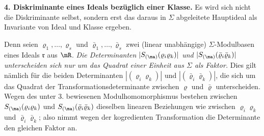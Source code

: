 \textbf{4. Diskriminante eines Ideals bezüglich einer Klasse.} Es wird sich nicht die Diskriminante selbst, sondern erst das daraus in $\Sigma$ abgeleitete Hauptideal als Invariante von Ideal und Klasse ergeben.

Denn seien $\varrho_1,\ldots,\varrho_s$ und $\bar\varrho_1,\ldots,\bar\varrho_s$ zwei (linear unabhängige) $\Sigma$-Modulbasen eines Ideals $\mathfrak r$ aus $\mR$. \emph{Die Determinanten $|S_{(\ma)}(\varrho_i\varrho_k)|$ und $|S_{(\ma)}(\bar\varrho_i\bar\varrho_k)|$ unterscheiden sich nur um das Quadrat einer Einheit aus $\Sigma$ als Faktor.} Dies gilt nämlich für die beiden Determinanten $|(\varrho_i\varrho_k)|$ und $|(\bar\varrho_i\bar\varrho_k)|$, die sich um das Quadrat der Transformationsdeterminante zwischen $\varrho$ und $\bar\varrho$ unterscheiden. Wegen des unter 3. bewiesenen Modulhomomorphismus bestehen zwischen $S_{(\ma)}(\varrho_i\varrho_k)$ und $S_{(\ma)}(\bar\varrho_i\bar\varrho_k)$ dieselben linearen Beziehungen wie zwischen $\varrho_i\varrho_k$ und $\bar\varrho_i\bar\varrho_k$; also nimmt wegen der kogredienten Transformation die Determinante den gleichen Faktor an.